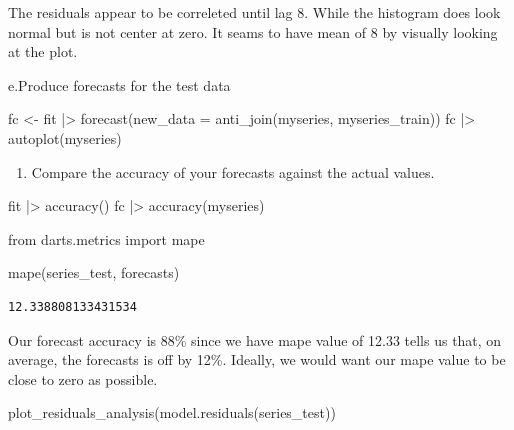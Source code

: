 \documentclass[
  11pt,
]{article}
\newenvironment{Shaded}{\begin{snugshade}}{\end{snugshade}}
\newcommand{\ImportTok}[1]{\textcolor[rgb]{0.00,0.46,0.62}{#1}}
\newcommand{\NormalTok}[1]{\textcolor[rgb]{0.00,0.23,0.31}{#1}}
\providecommand{\tightlist}{%
  \setlength{\itemsep}{0pt}\setlength{\parskip}{0pt}}\usepackage{longtable,booktabs,array}
\begin{document}
The residuals appear to be correleted until lag 8. While the histogram
does look normal but is not center at zero. It seams to have mean of 8
by visually looking at the plot.

e.Produce forecasts for the test data

\begin{Shaded}
\begin{Highlighting}[]
\NormalTok{fc \textless{}{-} fit |\textgreater{}}
\NormalTok{  forecast(new\_data = anti\_join(myseries, myseries\_train))}
\NormalTok{fc |\textgreater{} autoplot(myseries)}
\end{Highlighting}
\end{Shaded}

\begin{enumerate}
\def\labelenumi{\alph{enumi}.}
\setcounter{enumi}{5}
\tightlist
\item
  Compare the accuracy of your forecasts against the actual values.
\end{enumerate}

\begin{Shaded}
\begin{Highlighting}[]
\NormalTok{fit |\textgreater{} accuracy()}
\NormalTok{fc |\textgreater{} accuracy(myseries)}
\end{Highlighting}
\end{Shaded}

\begin{Shaded}
\begin{Highlighting}[]
\ImportTok{from}\NormalTok{ darts.metrics }\ImportTok{import}\NormalTok{ mape}

\NormalTok{mape(series\_test, forecasts)}
\end{Highlighting}
\end{Shaded}

\begin{verbatim}
12.338808133431534
\end{verbatim}

Our forecast accuracy is 88\% since we have mape value of 12.33 tells us
that, on average, the forecasts is off by 12\%. Ideally, we would want
our mape value to be close to zero as possible.

\begin{Shaded}
\begin{Highlighting}[]

\NormalTok{plot\_residuals\_analysis(model.residuals(series\_test))}
\end{Highlighting}
\end{Shaded}
\end{document}

